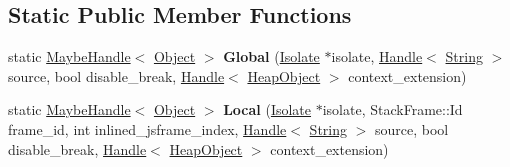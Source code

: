 \subsection*{Static Public Member Functions}
\begin{DoxyCompactItemize}
\item 
static \hyperlink{classv8_1_1internal_1_1_maybe_handle}{Maybe\+Handle}$<$ \hyperlink{classv8_1_1internal_1_1_object}{Object} $>$ {\bfseries Global} (\hyperlink{classv8_1_1internal_1_1_isolate}{Isolate} $\ast$isolate, \hyperlink{classv8_1_1internal_1_1_handle}{Handle}$<$ \hyperlink{classv8_1_1internal_1_1_string}{String} $>$ source, bool disable\+\_\+break, \hyperlink{classv8_1_1internal_1_1_handle}{Handle}$<$ \hyperlink{classv8_1_1internal_1_1_heap_object}{Heap\+Object} $>$ context\+\_\+extension)\hypertarget{classv8_1_1internal_1_1_debug_evaluate_ac33063e4d456f33ddd5078bd2a108938}{}\label{classv8_1_1internal_1_1_debug_evaluate_ac33063e4d456f33ddd5078bd2a108938}

\item 
static \hyperlink{classv8_1_1internal_1_1_maybe_handle}{Maybe\+Handle}$<$ \hyperlink{classv8_1_1internal_1_1_object}{Object} $>$ {\bfseries Local} (\hyperlink{classv8_1_1internal_1_1_isolate}{Isolate} $\ast$isolate, Stack\+Frame\+::\+Id frame\+\_\+id, int inlined\+\_\+jsframe\+\_\+index, \hyperlink{classv8_1_1internal_1_1_handle}{Handle}$<$ \hyperlink{classv8_1_1internal_1_1_string}{String} $>$ source, bool disable\+\_\+break, \hyperlink{classv8_1_1internal_1_1_handle}{Handle}$<$ \hyperlink{classv8_1_1internal_1_1_heap_object}{Heap\+Object} $>$ context\+\_\+extension)\hypertarget{classv8_1_1internal_1_1_debug_evaluate_af3cbd3990437efb76ecbc6cf642c1327}{}\label{classv8_1_1internal_1_1_debug_evaluate_af3cbd3990437efb76ecbc6cf642c1327}

\end{DoxyCompactItemize}
